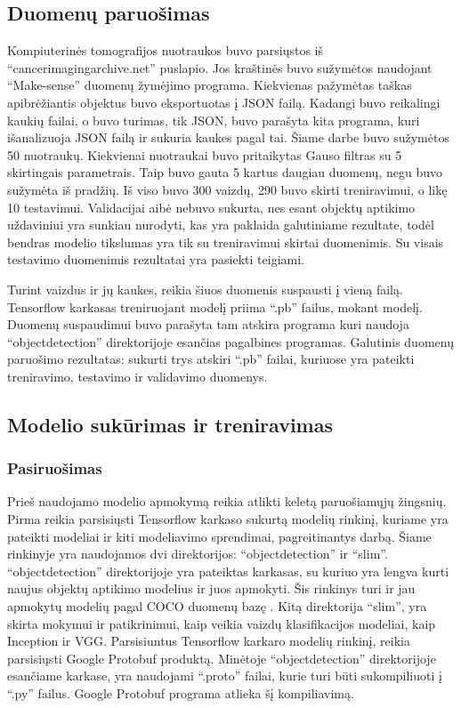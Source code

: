 \documentclass{VUMIFInfKursinis}
\begin{document}
\subsection{Duomenų paruošimas}
\par
Kompiuterinės tomografijos nuotraukos buvo parsiųstos iš
\enquote{cancerimagingarchive.net} puslapio.
Jos kraštinės buvo sužymėtos naudojant \enquote{Make-sense} duomenų žymėjimo programa.
Kiekvienas pažymėtas taškas apibrėžiantis objektus buvo
eksportuotas į JSON failą. Kadangi buvo reikalingi kaukių failai, o buvo turimas,
tik JSON, buvo parašyta kita programa, kuri išanalizuoja JSON failą ir
sukuria kaukes pagal tai. Šiame darbe buvo sužymėtos 50 nuotraukų.
Kiekvienai nuotraukai buvo pritaikytas Gauso filtras su 5 skirtingais
parametrais. Taip buvo gauta 5 kartus daugiau duomenų, negu buvo
sužymėta iš pradžių. Iš viso buvo 300 vaizdų, 290 buvo skirti treniravimui, o likę 10 testavimui. Validacijai aibė nebuvo sukurta, nes esant objektų aptikimo uždaviniui yra sunkiau nurodyti, kas yra paklaida galutiniame rezultate, todėl bendras modelio tikslumas yra tik su treniravimui skirtai duomenimis. Su visais testavimo duomenimis rezultatai yra pasiekti teigiami.
\par
Turint vaizdus ir jų kaukes, reikia šiuos duomenis suspausti į vieną failą.
Tensorflow karkasas treniruojant modelį priima \enquote{.pb} failus, mokant modelį.
Duomenų suspaudimui buvo parašyta tam atskira programa kuri naudoja \enquote{object\textunderscore detection}
direktorijoje esančias pagalbines programas.
Galutinis duomenų paruošimo rezultatas: sukurti trys atskiri \enquote{.pb}
failai, kuriuose yra pateikti treniravimo, testavimo ir validavimo duomenys.

\subsection{Modelio sukūrimas ir treniravimas}
\subsubsection{Pasiruošimas}
\par
Prieš naudojamo modelio apmokymą reikia atlikti keletą
paruošiamųjų žingsnių.
Pirma reikia parsisiųsti Tensorflow karkaso sukurtą modelių rinkinį, kuriame
yra pateikti modeliai ir kiti modeliavimo sprendimai, pagreitinantys darbą.
Šiame rinkinyje yra naudojamos dvi direktorijos: \enquote{object\textunderscore detection} ir \enquote{slim}.
\enquote{object\textunderscore detection} direktorijoje yra pateiktas karkasas, su kuriuo yra lengva
kurti naujus objektų aptikimo modelius ir juos apmokyti. Šis rinkinys turi ir
jau apmokytų modelių pagal COCO duomenų bazę \cite{salt21}. Kitą direktorija \enquote{slim},
yra skirta mokymui ir patikrinimui, kaip veikia vaizdų klasifikacijos
modeliai, kaip Inception ir VGG. Parsisiuntus Tensorflow karkaro modelių
rinkinį, reikia parsisiųsti Google Protobuf produktą. Minėtoje \enquote{object\textunderscore detection}
direktorijoje esančiame karkase, yra naudojami \enquote{.proto} failai, kurie turi būti
sukompiliuoti į \enquote{.py} failus. Google Protobuf programa atlieka šį kompiliavimą.
\end{document}
